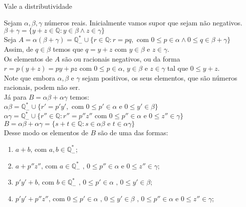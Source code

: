\documentclass[../main.tex]{subfiles}
\begin{document}
\begin{prop}
    Vale a distributividade
\end{prop}
\begin{dem}
    Sejam $\alpha, \beta, \gamma$ números reais. Inicialmente vamos supor que sejam não negativos. \\
    $\beta + \gamma = \{ y+z \in \mathbb{Q} : y \in \beta \land z \in \gamma \}$ \\
    Seja $A = \alpha(\beta+\gamma) = \mathbb{Q}^*_{-} \cup \{ r \in \mathbb{Q} : r = pq, \text{ com } 0 \leq p \in \alpha \land 0 \leq q \in \beta + \gamma \}$ \\
    Assim, de $q \in \beta$ temos que $q = y + z$ com $y \in \beta$ e $z \in \gamma$. \\
    Os elementos de $A$ são ou racionais negativos, ou da forma $r = p(y+z) = py + pz$ com $0 \leq p \in \alpha$, $y \in \beta$ e $z \in \gamma$ tal que $0 \leq y + z$. \\
    Note que embora $\alpha, \beta$ e $\gamma$ sejam positivos, os seus elementos, que são números racionais, podem não ser. \\

    Já para $B = \alpha\beta + \alpha\gamma$ temos: \\
    $\alpha\beta = \mathbb{Q}^*_{-} \cup \{ r'= p'y', \text{ com } 0 \leq p' \in \alpha \text{ e } 0 \leq y' \in \beta \}$ \\

    $\alpha \gamma = \mathbb{Q}^*_{-} \cup \{ r'' \in \mathbb{Q} : r'' = p''z'' \text{ com } 0 \leq p'' \in \alpha \text{ e } 0 \leq z'' \in \gamma \}$ \\
    
    $B = \alpha \beta + \alpha \gamma = \{ s+t \in \mathbb{Q} : s \in \alpha \beta \text{ e } t \in \alpha \gamma \}$ \\

    Desse modo os elementos de $B$ são de uma das formas:
    \begin{enumerate}[label=(\roman*)]\label{reais-dummy-charBFormas}
        \item\label{reais-dummy-charBa} $a + b \text{, com } a, b \in \mathbb{Q}^*_{-}$; 
        \item\label{reais-dummy-charBb} $a + p''z''\text{, com }a \in \mathbb{Q}^*_{-} \text{ , } 0 \leq p'' \in \alpha \text{ e }0 \leq z'' \in \gamma$; 
        \item\label{reais-dummy-charBc} $p'y' + b\text{, com }b \in \mathbb{Q}^*_{-} \text{ , } 0 \leq p' \in \alpha \text{ , } 0 \leq y' \in \beta$; 
        \item\label{reais-dummy-charBd} $p'y' + p''z''\text{, com }0 \leq p' \in  \alpha \text{ , } 0 \leq y' \in \beta \text{ , } 0 \leq p'' \in \alpha\text{ e }0 \leq z'' \in \gamma$;
    \end{enumerate}


\end{dem}
\end{document}
